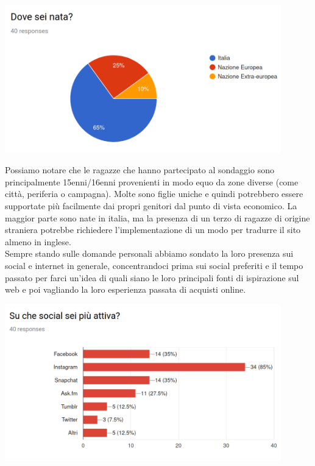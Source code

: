 \documentclass[12pt,a4paper]{report}
\begin{document}
\begin{flushleft}
  \includegraphics[width=0.9\textwidth]{"Images Latex/Grafici Sondaggi/4 - Dove sei nata"}
\end{flushleft}
Possiamo notare che le ragazze che hanno partecipato al sondaggio sono principalmente 15enni/16enni provenienti in modo equo da zone diverse (come città, periferia o campagna). Molte sono figlie uniche e quindi potrebbero essere supportate più facilmente dai propri genitori dal punto di vista economico. La maggior parte sono nate in italia, ma la presenza di un terzo di ragazze di origine straniera potrebbe richiedere l'implementazione di un modo per tradurre il sito almeno in inglese.\\
Sempre stando sulle domande personali abbiamo sondato la loro presenza sui social e internet in generale, concentrandoci prima sui social preferiti e il tempo passato per farci un'idea di quali siano le loro principali fonti di ispirazione sul web e poi vagliando la loro esperienza passata di acquisti online.
\begin{flushleft}
  \includegraphics[width=0.9\textwidth]{"Images Latex/Grafici Sondaggi/5 - Social piu attivi"}
\end{flushleft}
\end{document}
